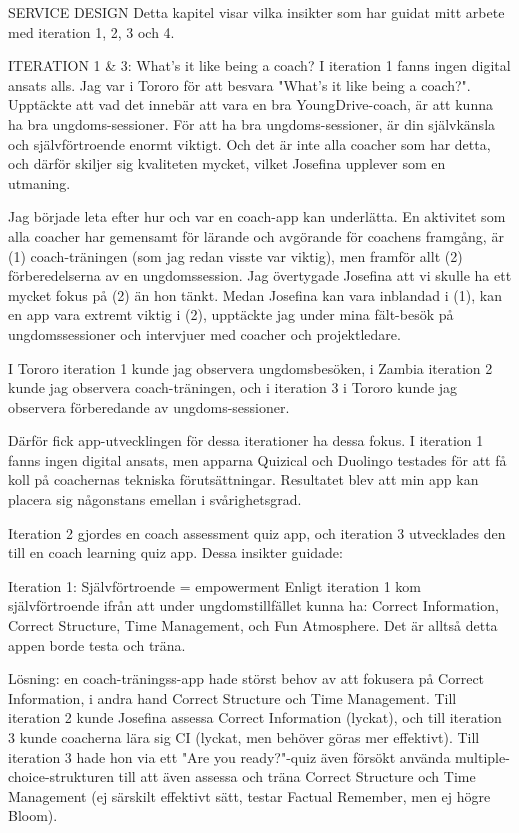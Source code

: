 SERVICE DESIGN
Detta kapitel visar vilka insikter som har guidat mitt arbete med iteration 1, 2, 3 och 4.

ITERATION 1 \& 3: What's it like being a coach?
I iteration 1 fanns ingen digital ansats alls. Jag var i Tororo för att besvara "What's it like being a coach?". Upptäckte att vad det innebär att vara en bra YoungDrive-coach, är att kunna ha bra ungdoms-sessioner. För att ha bra ungdoms-sessioner, är din självkänsla och självförtroende enormt viktigt. Och det är inte alla coacher som har detta, och därför skiljer sig kvaliteten mycket, vilket Josefina upplever som en utmaning.

Jag började leta efter hur och var en coach-app kan underlätta. En aktivitet som alla coacher har gemensamt för lärande och avgörande för coachens framgång, är (1) coach-träningen (som jag redan visste var viktig), men framför allt (2) förberedelserna av en ungdomssession. Jag övertygade Josefina att vi skulle ha ett mycket fokus på (2) än hon tänkt. Medan Josefina kan vara inblandad i (1), kan en app vara extremt viktig i (2), upptäckte jag under mina fält-besök på ungdomssessioner och intervjuer med coacher och projektledare.

I Tororo iteration 1 kunde jag observera ungdomsbesöken, i Zambia iteration 2 kunde jag observera coach-träningen, och i iteration 3 i Tororo kunde jag observera förberedande av ungdoms-sessioner.

Därför fick app-utvecklingen för dessa iterationer ha dessa fokus. I iteration 1 fanns ingen digital ansats, men apparna Quizical och Duolingo testades för att få koll på coachernas tekniska förutsättningar. Resultatet blev att min app kan placera sig någonstans emellan i svårighetsgrad.

Iteration 2 gjordes en coach assessment quiz app, och iteration 3 utvecklades den till en coach learning quiz app. Dessa insikter guidade:

Iteration 1: Självförtroende = empowerment
Enligt iteration 1 kom självförtroende ifrån att under ungdomstillfället kunna ha: Correct Information, Correct Structure, Time Management, och Fun Atmosphere. Det är alltså detta appen borde testa och träna.

Lösning: en coach-träningss-app hade störst behov av att fokusera på Correct Information, i andra hand Correct Structure och Time Management. Till iteration 2 kunde Josefina assessa Correct Information (lyckat), och till iteration 3 kunde coacherna lära sig CI (lyckat, men behöver göras mer effektivt). Till iteration 3 hade hon via ett "Are you ready?"-quiz även försökt använda multiple-choice-strukturen till att även assessa och träna Correct Structure och Time Management (ej särskilt effektivt sätt, testar Factual Remember, men ej högre Bloom).

